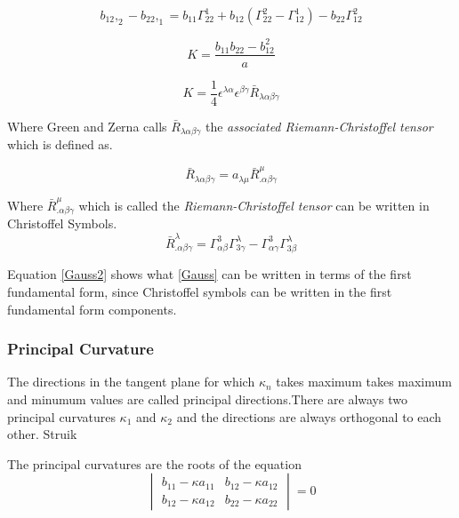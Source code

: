 \begin{equation}
   b_{12},_2 - b_{22},_1 = b_{11} \Gamma^1_{22} + b_{12}(\Gamma^2_{22} - \Gamma^1_{12}) - b_{22}\Gamma^2_{12} 
\end{equation}


\begin{equation}\label{Gauss}
  K= \frac{b_{11}b_{22}-b^2_{12}}{a}
\end{equation}

\begin{equation}
  K= \frac{1}{4}\epsilon^{\lambda \alpha} \epsilon^{\beta \gamma} \bar{R}_{\lambda \alpha \beta \gamma}
\end{equation}

Where Green and Zerna calls $\bar{R}_{\lambda \alpha \beta \gamma}$ the  \textit{associated Riemann-Christoffel tensor} which is defined as.

\begin{equation}
 \bar{R}_{\lambda \alpha \beta \gamma} = a_{\lambda \mu} \bar{R}^\mu_{.\alpha \beta \gamma}
\end{equation}

 Where $\bar{R}^\mu_{.\alpha \beta \gamma}$ which is called the \textit{Riemann-Christoffel tensor} can be written in Christoffel Symbols.
\begin{equation} \label{Gauss2}
\bar{R}^\lambda_{.\alpha \beta \gamma} = \Gamma^3_{\alpha \beta} \Gamma^\lambda_{3\gamma}-\Gamma^3_{\alpha \gamma}\Gamma^\lambda_{3\beta} 
\end{equation}

Equation \ref{Gauss2} shows what \ref{Gauss} can be written in terms of the first fundamental form, since Christoffel symbols can be written in the first fundamental form components.


\subsubsection{Principal Curvature}

The directions in the tangent plane for which $\kappa_n$ takes maximum takes maximum and minumum values are called principal directions.There are always two principal curvatures $\kappa_1$ and $\kappa_2$ and the directions are always orthogonal to each other.  Struik

The principal curvatures are the roots of the equation
\begin{equation}
  \begin{vmatrix} 
b_{11} - \kappa a_{11} & b_{12} - \kappa a_{12} \\ 
b_{12} - \kappa a_{12} & b_{22} - \kappa a_{22}
\end{vmatrix}
=0
\end{equation}

